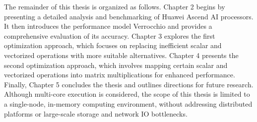 The remainder of this thesis is organized as follows. Chapter 2 begins by presenting a detailed analysis and benchmarking of Huawei Ascend AI processors. It then introduces the performance model Verrocchio and provides a comprehensive evaluation of its accuracy. Chapter 3 explores the first optimization approach, which focuses on replacing inefficient scalar and vectorized operations with more suitable alternatives. Chapter 4 presents the second optimization approach, which involves mapping certain scalar and vectorized operations into matrix multiplications for enhanced performance. Finally, Chapter 5 concludes the thesis and outlines directions for future research. Although multi-core execution is considered, the scope of this thesis is limited to a single-node, in-memory computing environment, without addressing distributed platforms or large-scale storage and network IO bottlenecks.